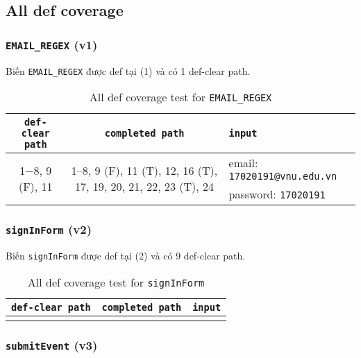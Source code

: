 \documentclass{article}
\begin{document}
\subsection{All def coverage}

\subsubsection*{\texttt{EMAIL\_REGEX} (v1)}

\par Biến \texttt{EMAIL\_REGEX} được def tại (1) và có 1 def-clear path.

\FloatBarrier
\begin{table}[htp]
    \centering
    \begin{tabular}{c|c|l}
        \texttt{def-clear path} & \texttt{completed path} & \texttt{input} \\
        \toprule
        \bottomrule
        \multirow{2}{*}{1$-$8, 9 (F), 11} & \multirow{2}{*}{1–8, 9 (F), 11 (T), 12, 16 (T), 17, 19, 20, 21, 22, 23 (T), 24} & email: \texttt{17020191@vnu.edu.vn} \\
        & & password: \texttt{17020191} \\
        \hline
    \end{tabular}
    \caption{All def coverage test for \texttt{EMAIL\_REGEX}}
\end{table}
\FloatBarrier

\subsubsection*{\texttt{signInForm} (v2)}

\par Biến \texttt{signInForm} được def tại (2) và có 9 def-clear path.

\FloatBarrier
\begin{table}[htp]
    \centering
    \begin{tabular}{c|c|c}
        \texttt{def-clear path} & \texttt{completed path} & \texttt{input} \\
        \toprule
        \bottomrule
         &  &
    \end{tabular}
    \caption{All def coverage test for \texttt{signInForm}}
\end{table}
\FloatBarrier

\subsubsection*{\texttt{submitEvent} (v3)}
\end{document}
